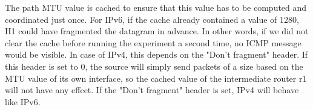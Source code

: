 The path MTU value is cached to ensure that this value has to be computed and coordinated just once. For IPv6, if the cache already contained a value of 1280, H1 could have fragmented the datagram in advance. In other words, if we did not clear the cache before running the experiment a second time, no ICMP message would be visible. In case of IPv4, this depends on the "Don't fragment" header. If this header is set to 0, the source will simply send packets of a size based on the MTU value of its own interface, so the cached value of the intermediate router r1 will not have any effect. If the "Don't fragment" header is set, IPv4 will behave like IPv6.